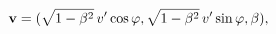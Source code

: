 \begin{equation}\label{hvel}
{\bf v} =
(\sqrt{1-\beta^2}\,v'\cos\varphi,\sqrt{1-\beta^2}\,v'\sin\varphi,\beta),
\end{equation}

